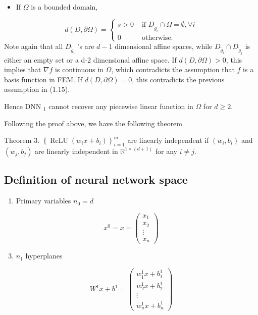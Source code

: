\documentclass[10pt]{article}
\begin{document}
  \begin{itemize}
    \item If $\Omega$ is a bounded domain,
  \end{itemize}
$$
d(D, \partial \Omega)= \begin{cases}s>0 & \text { if } D_{\tilde{g}_{i}} \cap \Omega=\emptyset, \forall i \\ 0 & \text { otherwise. }\end{cases}
$$
Note again that all $D_{\tilde{g}_{i}}$ 's are $d-1$ dimensional affine spaces, while $D_{\tilde{g}_{i}} \cap D_{\tilde{g}_{j}}$ is either an empty set or a d-2 dimensional affine space. If $d(D, \partial \Omega)>0$, this implies that $\nabla f$ is continuous in $\Omega$, which contradicts the assumption that $f$ is a basis function in FEM. If $d(D, \partial \Omega)=0$, this contradicts the previous assumption in (1.15).

Hence DNN $_{1}$ cannot recover any piecewise linear function in $\Omega$ for $d \geq 2 .$

Following the proof above, we have the following theorem

Theorem 3. $\left\{\operatorname{ReLU}\left(w_{i} x+b_{i}\right)\right\}_{i=1}^{m}$ are linearly independent if $\left(w_{i}, b_{i}\right)$ and $\left(w_{j}, b_{j}\right)$ are linearly independent in $\mathbb{R}^{1 \times(d+1)}$ for any $i \neq j .$

\subsection{Definition of neural network space}
  \begin{enumerate}
    \item Primary variables $n_{0}=d$
  \end{enumerate}
$$
x^{0}=x=\left(\begin{array}{c}
x_{1} \\
x_{2} \\
\vdots \\
x_{n}
\end{array}\right)
$$

  \begin{enumerate}
    \setcounter{enumii}{2}
    \item $n_{1}$ hyperplanes
  \end{enumerate}
$$
W^{1} x+b^{1}=\left(\begin{array}{c}
w_{1}^{1} x+b_{1}^{1} \\
w_{2}^{1} x+b_{2}^{1} \\
\vdots \\
w_{n}^{1} x+b_{n}^{1}
\end{array}\right)
$$
\end{document}
